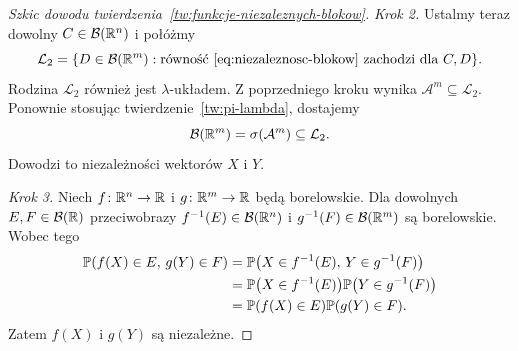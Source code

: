 \begin{proof}[Szkic dowodu twierdzenia~\ref{tw:funkcje-niezaleznych-blokow}]
\emph{Krok 2.} Ustalmy teraz dowolny $C\in\mathcal{B}(\mathbb{R}^n)$ i połóżmy
\[
  \mathcal L_2=
  \{D\in\mathcal{B}(\mathbb{R}^m):\text{równość~\eqref{eq:niezaleznosc-blokow}
    zachodzi dla }C,D\}.
\]
Rodzina $\mathcal L_2$ również jest $\lambda$-układem.
Z poprzedniego kroku wynika $\mathcal A^m\subseteq\mathcal L_2$.
Ponownie stosując twierdzenie~\ref{tw:pi-lambda}, dostajemy
\[
  \mathcal{B}(\mathbb{R}^m)=\sigma(\mathcal A^m)\subseteq\mathcal L_2.
\]
Dowodzi to niezależności wektorów $X$ i $Y$.

\emph{Krok 3.} Niech $f\colon\mathbb{R}^n\to\mathbb{R}$ i $g\colon\mathbb{R}^m\to\mathbb{R}$
będą borelowskie. Dla dowolnych $E,F\in\mathcal{B}(\mathbb{R})$ przeciwobrazy
$f^{-1}(E)\in\mathcal{B}(\mathbb{R}^n)$ i $g^{-1}(F)\in\mathcal{B}(\mathbb{R}^m)$ są borelowskie.
Wobec tego
\begin{align*}
  \mathbb{P}(f(X)\in E,\,g(Y)\in F)
    &=\mathbb{P}\bigl(X\in f^{-1}(E),\,Y\in g^{-1}(F)\bigr)\\
    &=\mathbb{P}\bigl(X\in f^{-1}(E)\bigr)
      \mathbb{P}\bigl(Y\in g^{-1}(F)\bigr)\\
    &=\mathbb{P}(f(X)\in E)\mathbb{P}(g(Y)\in F).
\end{align*}
Zatem $f(X)$ i $g(Y)$ są niezależne.
\end{proof}
